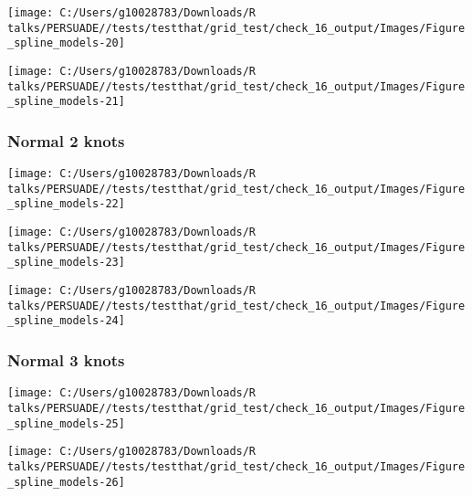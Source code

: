 \documentclass[
]{article}
\begin{document}
\begin{flushleft}\texttt{[image: C:/Users/g10028783/Downloads/R talks/PERSUADE//tests/testthat/grid\_test/check\_16\_output/Images/Figure\_spline\_models-20]} \end{flushleft}

\begin{flushleft}\texttt{[image: C:/Users/g10028783/Downloads/R talks/PERSUADE//tests/testthat/grid\_test/check\_16\_output/Images/Figure\_spline\_models-21]} \end{flushleft}

\clearpage

\subsubsection{Normal 2 knots}\label{normal-2-knots}

\begin{flushleft}\texttt{[image: C:/Users/g10028783/Downloads/R talks/PERSUADE//tests/testthat/grid\_test/check\_16\_output/Images/Figure\_spline\_models-22]} \end{flushleft}

\begin{flushleft}\texttt{[image: C:/Users/g10028783/Downloads/R talks/PERSUADE//tests/testthat/grid\_test/check\_16\_output/Images/Figure\_spline\_models-23]} \end{flushleft}

\begin{flushleft}\texttt{[image: C:/Users/g10028783/Downloads/R talks/PERSUADE//tests/testthat/grid\_test/check\_16\_output/Images/Figure\_spline\_models-24]} \end{flushleft}

\clearpage

\subsubsection{Normal 3 knots}\label{normal-3-knots}

\begin{flushleft}\texttt{[image: C:/Users/g10028783/Downloads/R talks/PERSUADE//tests/testthat/grid\_test/check\_16\_output/Images/Figure\_spline\_models-25]} \end{flushleft}

\begin{flushleft}\texttt{[image: C:/Users/g10028783/Downloads/R talks/PERSUADE//tests/testthat/grid\_test/check\_16\_output/Images/Figure\_spline\_models-26]} \end{flushleft}
\end{document}
